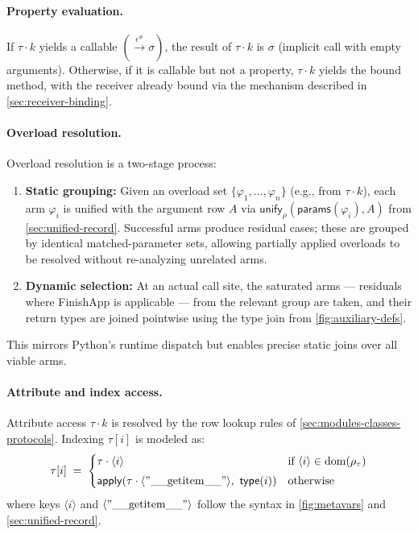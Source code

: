 \paragraph{Property evaluation.}
If $\tau \cdot k$ yields a callable $(\xrightarrow{\epsilon^\#} \sigma)$, 
the result of $\tau \cdot k$ is $\sigma$ (implicit call with empty arguments).  
Otherwise, if it is callable but not a property, $\tau \cdot k$ yields the bound method, with the receiver already bound via the mechanism described in \autoref{sec:receiver-binding}.

\paragraph{Overload resolution.}
\label{sec:overload-resolution}
Overload resolution is a two-stage process:
\begin{enumerate}
\item \textbf{Static grouping:}  
  Given an overload set $\{\varphi_1, \ldots, \varphi_n\}$ (e.g., from $\tau \cdot k$), each arm $\varphi_i$ is unified with the argument row $A$ via  
  $\mathsf{unify}_{\rho}(\mathsf{params}(\varphi_i), A)$ from \autoref{sec:unified-record}.  
  Successful arms produce residual cases; these are grouped by identical matched-parameter sets, allowing partially applied overloads to be resolved without re-analyzing unrelated arms.
\item \textbf{Dynamic selection:}  
  At an actual call site, the saturated arms --- residuals where \textsf{FinishApp} is applicable --- from the relevant group are taken, and their return types are joined pointwise using the type join from \autoref{fig:auxiliary-defs}.
\end{enumerate}
This mirrors Python’s runtime dispatch but enables precise static joins over all viable arms.

\paragraph{Attribute and index access.}  
\label{sec:rows-generic-access}
Attribute access $\tau \cdot k$ is resolved by the row lookup rules of \autoref{sec:modules-classes-protocols}.  
Indexing $\tau[i]$ is modeled as:
\[
\tau[i] \;=\;
\begin{cases}
\tau \cdot \langle i\rangle & \text{if $\langle i\rangle \in \mathrm{dom}(\rho_\tau)$} \\[0.3em]
\mathsf{apply}(\tau \cdot \langle \mathrm{"\_\_getitem\_\_"}\rangle,\ \mathsf{type}(i)) & \text{otherwise}
\end{cases}
\]
where keys $\langle i\rangle$ and $\langle \mathrm{"\_\_getitem\_\_"}\rangle$ follow the syntax in \autoref{fig:metavars} and \autoref{sec:unified-record}.


